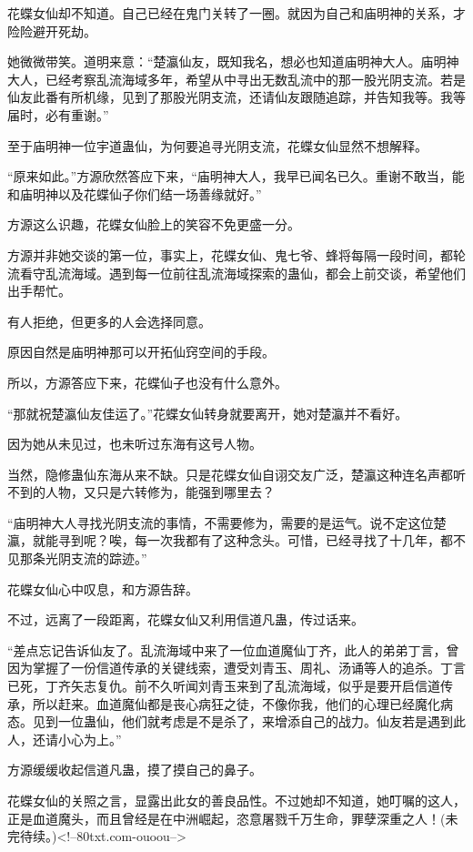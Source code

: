 \begin{this_body}
花蝶女仙却不知道。自己已经在鬼门关转了一圈。就因为自己和庙明神的关系，才险险避开死劫。

她微微带笑。道明来意：“楚瀛仙友，既知我名，想必也知道庙明神大人。庙明神大人，已经考察乱流海域多年，希望从中寻出无数乱流中的那一股光阴支流。若是仙友此番有所机缘，见到了那股光阴支流，还请仙友跟随追踪，并告知我等。我等届时，必有重谢。”

至于庙明神一位宇道蛊仙，为何要追寻光阴支流，花蝶女仙显然不想解释。

“原来如此。”方源欣然答应下来，“庙明神大人，我早已闻名已久。重谢不敢当，能和庙明神以及花蝶仙子你们结一场善缘就好。”

方源这么识趣，花蝶女仙脸上的笑容不免更盛一分。

方源并非她交谈的第一位，事实上，花蝶女仙、鬼七爷、蜂将每隔一段时间，都轮流看守乱流海域。遇到每一位前往乱流海域探索的蛊仙，都会上前交谈，希望他们出手帮忙。

有人拒绝，但更多的人会选择同意。

原因自然是庙明神那可以开拓仙窍空间的手段。

所以，方源答应下来，花蝶仙子也没有什么意外。

“那就祝楚瀛仙友佳运了。”花蝶女仙转身就要离开，她对楚瀛并不看好。

因为她从未见过，也未听过东海有这号人物。

当然，隐修蛊仙东海从来不缺。只是花蝶女仙自诩交友广泛，楚瀛这种连名声都听不到的人物，又只是六转修为，能强到哪里去？

“庙明神大人寻找光阴支流的事情，不需要修为，需要的是运气。说不定这位楚瀛，就能寻到呢？唉，每一次我都有了这种念头。可惜，已经寻找了十几年，都不见那条光阴支流的踪迹。”

花蝶女仙心中叹息，和方源告辞。

不过，远离了一段距离，花蝶女仙又利用信道凡蛊，传过话来。

“差点忘记告诉仙友了。乱流海域中来了一位血道魔仙丁齐，此人的弟弟丁言，曾因为掌握了一份信道传承的关键线索，遭受刘青玉、周礼、汤诵等人的追杀。丁言已死，丁齐矢志复仇。前不久听闻刘青玉来到了乱流海域，似乎是要开启信道传承，所以赶来。血道魔仙都是丧心病狂之徒，不像你我，他们的心理已经魔化病态。见到一位蛊仙，他们就考虑是不是杀了，来增添自己的战力。仙友若是遇到此人，还请小心为上。”

方源缓缓收起信道凡蛊，摸了摸自己的鼻子。

花蝶女仙的关照之言，显露出此女的善良品性。不过她却不知道，她叮嘱的这人，正是血道魔头，而且曾经是在中洲崛起，恣意屠戮千万生命，罪孽深重之人！(未完待续。)<!--80txt.com-ouoou-->

\end{this_body}

